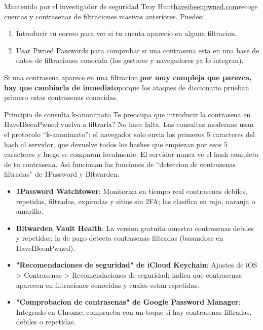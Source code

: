 
Mantenido por el investigador de seguridad Troy Hunt\href{https://haveibeenpwned.com}{haveibeenpwned.com}recoge cuentas y contrasenas de filtraciones masivas anteriores. Puedes:

\begin{enumerate}
  \item Introducir tu correo para ver si tu cuenta aparecio en alguna filtracion.
  \item Usar Pwned Passwords para comprobar si una contrasena esta en una base de datos de filtraciones conocida (los gestores y navegadores ya lo integran).
\end{enumerate}

Si una contrasena aparece en una filtracion,\textbf{por muy compleja que parezca, hay que cambiarla de inmediato}porque los ataques de diccionario prueban primero estas contrasenas conocidas.

\begin{tcbinfo}{Principio de consulta k-anonimato}
Te preocupa que introducir la contrasena en HaveIBeenPwned vuelva a filtrarla? No hace falta. Las consultas modernas usan el protocolo “k-anonimato”: el navegador solo envia los primeros 5 caracteres del hash al servidor, que devuelve todos los hashes que empiezan por esos 5 caracteres y luego se comparan localmente. El servidor nunca ve el hash completo de tu contrasena. Asi funcionan las funciones de “deteccion de contrasenas filtradas” de 1Password y Bitwarden.

\end{tcbinfo}


\begin{itemize}
  \item \textbf{1Password Watchtower}: Monitoriza en tiempo real contrasenas debiles, repetidas, filtradas, expiradas y sitios sin 2FA; las clasifica en rojo, naranja o amarillo.
  \item \textbf{Bitwarden Vault Health}: La version gratuita muestra contrasenas debiles y repetidas; la de pago detecta contrasenas filtradas (basandose en HaveIBeenPwned).
  \item \textbf{"Recomendaciones de seguridad" de iCloud Keychain}: Ajustes de iOS > Contrasenas > Recomendaciones de seguridad; indica que contrasenas aparecen en filtraciones conocidas y cuales estan repetidas.
  \item \textbf{"Comprobacion de contrasenas" de Google Password Manager}: Integrado en Chrome; comprueba con un toque si hay contrasenas filtradas, debiles o repetidas.
\end{itemize}

